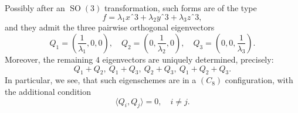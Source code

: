\documentclass{amsart}
\theoremstyle{plain}
\theoremstyle{definition}
\newcommand{\SO}{\operatorname{SO}}
\begin{document}
Possibly after an $\SO(3)$ transformation, such forms are of the type
$$
f=\lambda_1 xˆ3 +\lambda_2 yˆ3 + \lambda_3 zˆ3,
$$
and they admit the three pairwise orthogonal eigenvectors
$$
Q_1=(\frac{1}{\lambda_1},0,0), \quad 
Q_2=(0,\frac{1}{\lambda_2},0),\quad
Q_3=(0,0,\frac{1}{\lambda_3}).
$$
Moreover, the remaining $4$ eigenvectors are uniquely determined, precisely:
$$
Q_1+Q_2, \ Q_1 +Q_3, \ Q_2 +Q_3, \ Q_1+Q_2+Q_3.
$$
In particular, we see, that such eigenschemes are in a $(C_8)$ configuration, with the additional condition
$$
\langle Q_i,Q_j \rangle =0, \quad i \neq j.
$$



\end{document}
